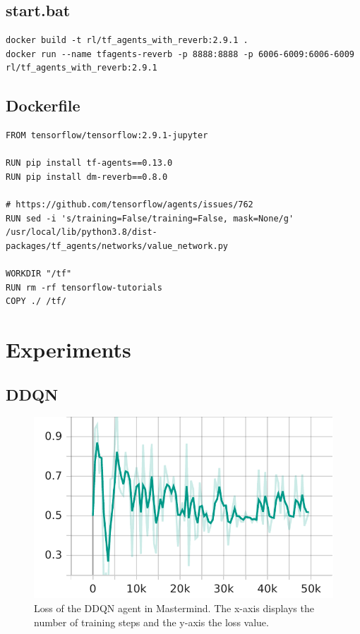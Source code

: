 \section{start.bat}
\label{sec:app_batch}


\begin{verbatim}
docker build -t rl/tf_agents_with_reverb:2.9.1 .
docker run --name tfagents-reverb -p 8888:8888 -p 6006-6009:6006-6009 rl/tf_agents_with_reverb:2.9.1
\end{verbatim}

\section{Dockerfile}
\label{sec:app_docker}

\begin{verbatim}
FROM tensorflow/tensorflow:2.9.1-jupyter

RUN pip install tf-agents==0.13.0
RUN pip install dm-reverb==0.8.0

# https://github.com/tensorflow/agents/issues/762
RUN sed -i 's/training=False/training=False, mask=None/g' /usr/local/lib/python3.8/dist-packages/tf_agents/networks/value_network.py

WORKDIR "/tf"
RUN rm -rf tensorflow-tutorials
COPY ./ /tf/
\end{verbatim}

\chapter{Experiments}
\label{chap:app_exp}


\section{DDQN}

\begin{figure}[H]
	\centering
	\includegraphics[scale=.75]{images/stats/ddqn_50k/Losses_td_loss}
	\caption[DDQN loss]{Loss of the DDQN agent in Mastermind. The x-axis displays the number of training steps and the y-axis the loss value.}
	\label{fig:ddqn_tderr}
\end{figure}

